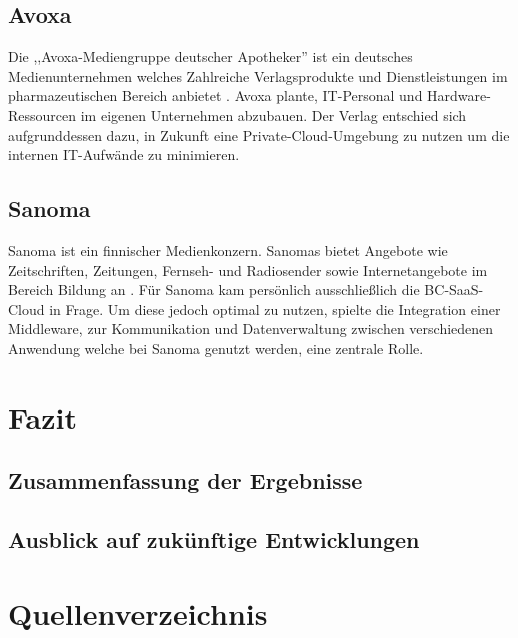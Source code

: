 \documentclass[12pt,bibtotoc]{article}
\newcounter{romanBeginningEnd} %
\begin{document}
			\subsection{Avoxa}\label{Avoxa}
			Die ,,Avoxa-Mediengruppe deutscher Apotheker'' ist ein deutsches Medienunternehmen welches Zahlreiche Verlagsprodukte und Dienstleistungen im pharmazeutischen Bereich anbietet \cite{Avoxa-Website.2024}. \newline 
			Avoxa plante, IT-Personal und Hardware-Ressourcen im eigenen Unternehmen abzubauen. Der Verlag entschied sich aufgrunddessen dazu, in Zukunft eine Private-Cloud-Umgebung zu nutzen um die internen IT-Aufwände zu minimieren.
			\subsection{Sanoma}\label{Sanoma}
			Sanoma ist ein finnischer Medienkonzern. Sanomas bietet Angebote wie Zeitschriften, Zeitungen, Fernseh- und  Radiosender sowie Internetangebote im Bereich Bildung an \cite{Sanoma-Website.2024}. \newline
			Für Sanoma kam persönlich ausschließlich die BC-SaaS-Cloud in Frage. Um diese jedoch optimal zu nutzen, spielte die Integration einer Middleware, zur Kommunikation und Datenverwaltung zwischen verschiedenen Anwendung welche bei Sanoma genutzt werden, eine zentrale Rolle.

	\section{Fazit}
		\subsection{Zusammenfassung der Ergebnisse}
		\subsection{Ausblick auf zukünftige Entwicklungen}




	
	
	\newpage
	\setcounter{page}{\theromanBeginningEnd} %
	\setcounter{secnumdepth}{0} %
	\section{Quellenverzeichnis}
	\setcounter{secnumdepth}{3} %
	\printbibliography[heading=none]
	\newpage
	\appendix
	\clearpage
	
\end{document}

